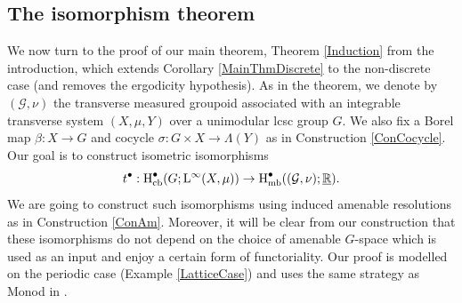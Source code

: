 \documentclass[11pt, oneside]{amsart}
\theoremstyle{definition}
\theoremstyle{remark}
\theoremstyle{TheoremNum}
\newcommand{\Hmb}{\textup{H}_{\textup{mb}}}
\newcommand{\Hcb}{\textup{H}_{\textup{cb}}}
\newcommand{\Linf}{\mathrm{L}^{\infty}}
\newcommand{\cG}{\mathcal{G}}
\newcommand{\bR}{\mathbb{R}}
\begin{document}
\subsection{The isomorphism theorem}\label{sec:6.2}
We now turn to the proof of our main theorem, Theorem \ref{Induction} from the introduction, which extends Corollary \ref{MainThmDiscrete} to the non-discrete case (and removes the ergodicity hypothesis). As in the theorem, we denote by $(\mathcal{G}, \nu)$ the transverse measured groupoid associated with an integrable transverse system $(X, \mu, Y)$ over a unimodular lcsc group $G$. We also fix a Borel map $\beta: X \to G$ and cocycle $\sigma: G\times X\to \Lambda(Y)$ as in Construction \ref{ConCocycle}. Our goal is to construct isometric isomorphisms
\begin{equation}
t^\bullet: \Hcb^\bullet(G; \Linf (X, \mu)) \to \Hmb^\bullet((\cG,\nu); \underline{\bR}).
\end{equation}
We are going to construct such isomorphisms using induced amenable resolutions as in Construction \ref{ConAm}. Moreover, it will be clear from our construction that these isomorphisms do not depend on the choice of amenable $G$-space which is used as an input and enjoy a certain form of functoriality. Our proof is modelled on the periodic case (Example \ref{LatticeCase}) and uses the same strategy as Monod in \cite[Lemma 5.4.3]{monod:libro}. 
\end{document}
